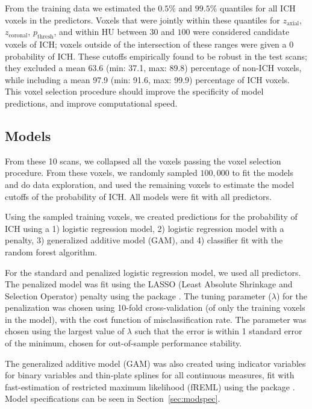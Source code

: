 From the training data we estimated the $0.5\%$ and $99.5\%$ quantiles for all ICH voxels in the predictors.  Voxels that were jointly within these quantiles for $z_{\text{axial}}$, $z_{\text{coronal}}$, $p_{\text{thresh}}$, and within HU between $30$ and $100$ were considered candidate voxels of ICH; voxels outside of the intersection of these ranges were given a $0$ probability of ICH. These cutoffs empirically found to be robust in the test scans; they excluded a mean 63.6 (min: 37.1, max: 89.8) percentage of non-ICH voxels, while including a mean 97.9 (min: 91.6, max: 99.9) percentage of ICH voxels.  This voxel selection procedure should improve the specificity of model predictions, and improve computational speed.  

\subsection{Models}

From these 10 scans, we collapsed all the voxels passing the voxel selection procedure.  From these voxels, we randomly sampled $100{,}000$ to fit the models and do data exploration, and used the remaining voxels to estimate the model cutoffs of the probability of ICH.   All models were fit with all predictors.  


Using the sampled training voxels, we created predictions for the probability of ICH using a 1) logistic regression model, 2) logistic regression model with a penalty, 3) generalized additive model (GAM), and 4) classifier fit with the random forest algorithm.

For the standard and penalized logistic regression model, we used all predictors.  The penalized model was fit using the LASSO (Least Absolute Shrinkage and Selection Operator) penalty \citep{tibshirani_regression_1996} using the  package \citep{friedman_regularization_2010}.  The tuning parameter ($\lambda$) for the penalization was chosen using 10-fold cross-validation (of only the training voxels in the model), with the cost function of misclassification rate.  The parameter was chosen using the largest value of $\lambda$ such that the error is within 1 standard error of the minimum, chosen for out-of-sample performance stability.

The generalized additive model (GAM) \citep{hastie_generalized_1986, hastie_generalized_1990} was also created using indicator variables for binary variables and thin-plate splines for all continuous measures, fit with fast-estimation of restricted maximum likelihood (fREML) using the  package \citep{wood_fast_2011, wood_generalized_2015}.   Model specifications can be seen in Section~\ref{sec:modspec}.


